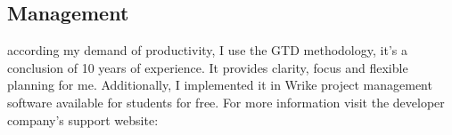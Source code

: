 		\subsection{Management}
according my demand of productivity, I use the GTD\cite{GTD} methodology, it's a conclusion of 10 years of experience. It provides clarity, focus and flexible planning for me. Additionally, I implemented it in Wrike \cite{WRIKE} project management software available for students for free. For more information visit the developer company's support website: \cite{WRIKE_for_students}